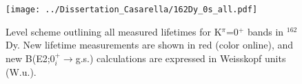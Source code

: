 \begin{landscape}
\begin{figure}[t]
\begin{center}
\texttt{[image: ../Dissertation\_Casarella/162Dy\_0s\_all.pdf]}
\caption{Level scheme outlining all measured lifetimes for K$^\pi$=0$^+$ bands in $^{162}$Dy. New lifetime measurements are shown in red (color online), and new B(E2;0$^+_i\rightarrow$g.s.) calculations are expressed in Weisskopf units (W.u.). \label{fig:162Dy_0s_all}}
\end{center}
\end{figure}
\end{landscape}



